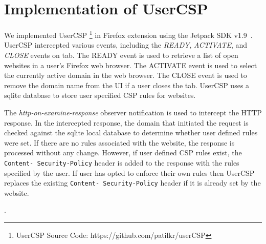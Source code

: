 \section {Implementation of UserCSP}
\label{sec:imp}

We implemented UserCSP \footnote[1]{UserCSP Source Code:
  https://github.com/patilkr/userCSP} in Firefox extension using the
Jetpack SDK v1.9~\cite{JetPack-SDK}. UserCSP intercepted various
events, including the {\it READY}, {\it ACTIVATE}, and {\it CLOSE} events on
tab. The READY event is used to retrieve a list of open websites in a
user's Firefox web browser. The ACTIVATE event is used to select the
currently active domain in the web browser.  The CLOSE event is used
to remove the domain name from the UI if a user closes the
tab. UserCSP uses a sqlite database to store user specified CSP rules
for websites.

The {\it http-on-examine-response} observer notification is used to
intercept the HTTP response. In the intercepted response, the domain
that initiated the request is checked against the sqlite local
database to determine whether user defined rules were set. If there
are no rules associated with the website, the response is processed
without any change.  However, if user defined CSP rules exist, the
{\tt Content- Security-Policy} header is added to the response with
the rules specified by the user. If user has opted to enforce their
own rules then UserCSP replaces the existing {\tt Content-
  Security-Policy} header if it is already set by the website.

.



